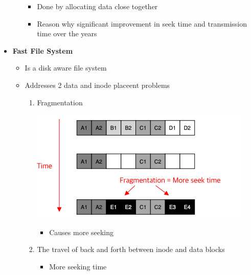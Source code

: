 \documentclass[12pt]{article}
\begin{document}
\begin{itemize}
\begin{itemize}
        \begin{itemize}
            \item Done by allocating data close together
            \item Reason why significant improvement in seek time and transmission time over the years
        \end{itemize}
    \end{itemize}
    \item \textbf{Fast File System}
    \begin{itemize}
        \item Is a disk aware file system
        \item Addresses 2 data and inode placeent problems
        \begin{enumerate}[1.]
            \item Fragmentation
            \begin{center}
            \includegraphics[width=0.8\linewidth]{images/notes_6.png}
            \end{center}

            \begin{itemize}
                \item Causes more seeking
            \end{itemize}
            \item The travel of back and forth between inode and data blocks
            \begin{itemize}
                \item More seeking time
            \end{itemize}
        \end{enumerate}
    \end{itemize}
\end{itemize}
\end{document}
